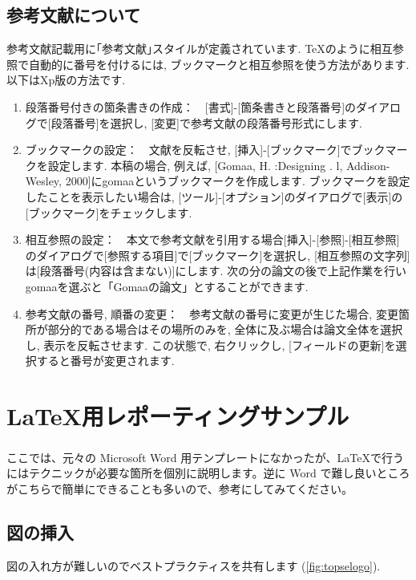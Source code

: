 \documentclass[a4paper,9pt]{extarticle}
\begin{document}
\begin{multicols}{2}
\subsection{参考文献について}
参考文献記載用に｢参考文献｣スタイルが定義されています. TeXのように相互参照で自動的に番号を付けるには, ブックマークと相互参照を使う方法があります. 以下はXp版の方法です. 

\begin{enumerate}
    \item 段落番号付きの箇条書きの作成：　[書式]-[箇条書きと段落番号]のダイアログで[段落番号]を選択し, [変更]で参考文献の段落番号形式にします. 
    \item ブックマークの設定：　文献を反転させ, [挿入]-[ブックマーク]でブックマークを設定します. 本稿の場合, 例えば, [Gomaa,  H. :Designing . l,  Addison-Wesley,  2000]にgomaaというブックマークを作成します. ブックマークを設定したことを表示したい場合は, [ツール]-[オプション]のダイアログで[表示]の[ブックマーク]をチェックします. 
    \item 相互参照の設定：　本文で参考文献を引用する場合[挿入]-[参照]-[相互参照]のダイアログで[参照する項目]で[ブックマーク]を選択し, [相互参照の文字列]は[段落番号(内容は含まない)]にします. 次の分の論文の後で上記作業を行いgomaaを選ぶと「Gomaaの論文\cite{Gomaa}」とすることができます. 
    \item 参考文献の番号, 順番の変更：　参考文献の番号に変更が生じた場合, 変更箇所が部分的である場合はその場所のみを, 全体に及ぶ場合は論文全体を選択し, 表示を反転させます. この状態で, 右クリックし, [フィールドの更新]を選択すると番号が変更されます. 
\end{enumerate}


\section{\LaTeX 用レポーティングサンプル}
ここでは、元々の Microsoft\textsuperscript{\textregistered} Word 用テンプレートになかったが、\LaTeX で行うにはテクニックが必要な箇所を個別に説明します。逆に Word で難し良いところがこちらで簡単にできることも多いので、参考にしてみてください\cite{takahashi}。


\subsection{図の挿入}
図の入れ方が難しいのでベストプラクティスを共有します (\autoref{fig:topselogo}). 


\end{multicols}
\end{document}
